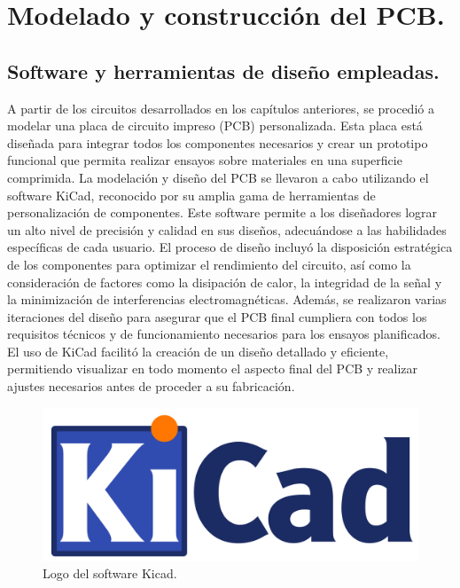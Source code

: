 \chapter{Modelado y construcción del PCB.}

\label{C:EModelado y construcción del PCB.}

\section{Software y herramientas de diseño empleadas.}

A partir de los circuitos desarrollados en los capítulos anteriores, se procedió a modelar una placa de circuito impreso (PCB) personalizada. Esta placa está diseñada para integrar todos los componentes necesarios y crear un prototipo funcional que permita realizar ensayos sobre materiales en una superficie comprimida.
La modelación y diseño del PCB se llevaron a cabo utilizando el software KiCad, reconocido por su amplia gama de herramientas de personalización de componentes. Este software permite a los diseñadores lograr un alto nivel de precisión y calidad en sus diseños, adecuándose a las habilidades específicas de cada usuario.
El proceso de diseño incluyó la disposición estratégica de los componentes para optimizar el rendimiento del circuito, así como la consideración de factores como la disipación de calor, la integridad de la señal y la minimización de interferencias electromagnéticas. Además, se realizaron varias iteraciones del diseño para asegurar que el PCB final cumpliera con todos los requisitos técnicos y de funcionamiento necesarios para los ensayos planificados.
El uso de KiCad facilitó la creación de un diseño detallado y eficiente, permitiendo visualizar en todo momento el aspecto final del PCB y realizar ajustes necesarios antes de proceder a su fabricación.
\begin{figure}[H]
    \centering
    \includegraphics[scale=0.03]{./imagenes/KiCad-Logo.svg_.png}
    \caption{Logo del software Kicad.}
    \label{F:kicad}
\end{figure}

